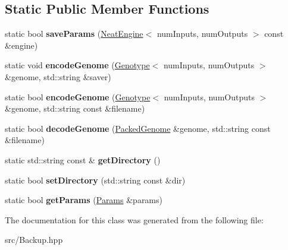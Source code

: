 \subsection*{Static Public Member Functions}
\begin{DoxyCompactItemize}
\item 
\mbox{\label{class_indie_neat_1_1_backup_a773e9e13579a40543ca31ceac3c21ba2}} 
static bool {\bfseries save\+Params} (\hyperlink{class_indie_neat_1_1_neat_engine}{Neat\+Engine}$<$ num\+Inputs, num\+Outputs $>$ const \&engine)
\item 
\mbox{\label{class_indie_neat_1_1_backup_a2b8db0837a930e491f692c7b9fccbccd}} 
static void {\bfseries encode\+Genome} (\hyperlink{class_indie_neat_1_1_genotype}{Genotype}$<$ num\+Inputs, num\+Outputs $>$ \&genome, std\+::string \&saver)
\item 
\mbox{\label{class_indie_neat_1_1_backup_aacb848f2c3955f1c6354a5153efe224b}} 
static bool {\bfseries encode\+Genome} (\hyperlink{class_indie_neat_1_1_genotype}{Genotype}$<$ num\+Inputs, num\+Outputs $>$ \&genome, std\+::string const \&filename)
\item 
\mbox{\label{class_indie_neat_1_1_backup_ac58b81e59e3781d9eb1c3d408380c6db}} 
static bool {\bfseries decode\+Genome} (\hyperlink{struct_indie_neat_1_1_backup_1_1_packed_genome}{Packed\+Genome} \&genome, std\+::string const \&filename)
\item 
\mbox{\label{class_indie_neat_1_1_backup_a817b72045a454b966f9a4a45d5a61e31}} 
static std\+::string const  \& {\bfseries get\+Directory} ()
\item 
\mbox{\label{class_indie_neat_1_1_backup_ab30a6d7996f11c8a13bc1c9489a10e29}} 
static bool {\bfseries set\+Directory} (std\+::string const \&dir)
\item 
\mbox{\label{class_indie_neat_1_1_backup_a3a6daec23ae5c450d66da35bd13e3c6f}} 
static bool {\bfseries get\+Params} (\hyperlink{struct_indie_neat_1_1_backup_1_1_params}{Params} \&params)
\end{DoxyCompactItemize}


The documentation for this class was generated from the following file\+:\begin{DoxyCompactItemize}
\item 
src/Backup.\+hpp\end{DoxyCompactItemize}
